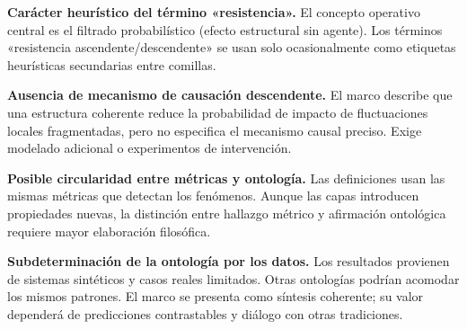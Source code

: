 \textbf{Carácter heurístico del término «resistencia».} El concepto operativo central es el filtrado probabilístico (efecto estructural sin agente). Los términos «resistencia ascendente/descendente» se usan solo ocasionalmente como etiquetas heurísticas secundarias entre comillas.

\textbf{Ausencia de mecanismo de causación descendente.} El marco describe que una estructura coherente reduce la probabilidad de impacto de fluctuaciones locales fragmentadas, pero no especifica el mecanismo causal preciso. Exige modelado adicional o experimentos de intervención.

\textbf{Posible circularidad entre métricas y ontología.} Las definiciones usan las mismas métricas que detectan los fenómenos. Aunque las capas introducen propiedades nuevas, la distinción entre hallazgo métrico y afirmación ontológica requiere mayor elaboración filosófica.

\textbf{Subdeterminación de la ontología por los datos.} Los resultados provienen de sistemas sintéticos y casos reales limitados. Otras ontologías podrían acomodar los mismos patrones. El marco se presenta como síntesis coherente; su valor dependerá de predicciones contrastables y diálogo con otras tradiciones.